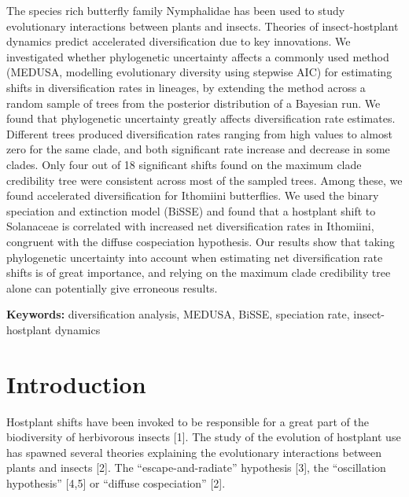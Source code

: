 \documentclass[10pt]{article}
\begin{document}
The species rich butterfly family Nymphalidae has been used to study
evolutionary interactions between plants and insects. Theories of
insect-hostplant dynamics predict accelerated diversification due to key
innovations. We investigated whether phylogenetic uncertainty affects a
commonly used method (MEDUSA, modelling evolutionary diversity using
stepwise AIC) for estimating shifts in diversification rates in
lineages, by extending the method across a random sample of trees from
the posterior distribution of a Bayesian run. We found that phylogenetic
uncertainty greatly affects diversification rate estimates. Different
trees produced diversification rates ranging from high values to almost
zero for the same clade, and both significant rate increase and decrease
in some clades. Only four out of 18 significant shifts found on the
maximum clade credibility tree were consistent across most of the
sampled trees. Among these, we found accelerated diversification for
Ithomiini butterflies. We used the binary speciation and extinction
model (BiSSE) and found that a hostplant shift to Solanaceae is
correlated with increased net diversification rates in Ithomiini,
congruent with the diffuse cospeciation hypothesis. Our results show
that taking phylogenetic uncertainty into account when estimating net
diversification rate shifts is of great importance, and relying on the
maximum clade credibility tree alone can potentially give erroneous
results.

\textbf{Keywords:} diversification analysis, MEDUSA, BiSSE, speciation
rate, insect-hostplant dynamics

\section*{Introduction}

Hostplant shifts have been invoked to be responsible for a great part of
the biodiversity of herbivorous insects {[}1{]}. The study of the
evolution of hostplant use has spawned several theories explaining the
evolutionary interactions between plants and insects {[}2{]}. The
``escape-and-radiate'' hypothesis {[}3{]}, the ``oscillation
hypothesis'' {[}4,5{]} or ``diffuse cospeciation'' {[}2{]}.
\end{document}
